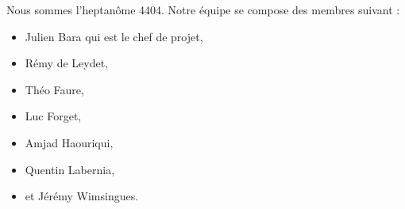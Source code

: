 Nous sommes l'heptanôme 4404. Notre équipe se compose des membres suivant : 

\begin{itemize}
\item Julien Bara qui est le chef de projet,
\item Rémy de Leydet,
\item Théo Faure,
\item Luc Forget,
\item Amjad Haouriqui,
\item Quentin Labernia,
\item et Jérémy Wimsingues.
\end{itemize}